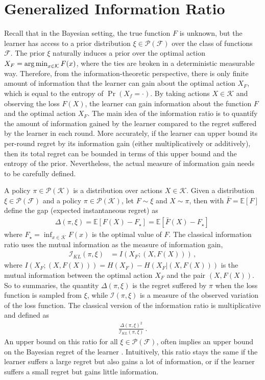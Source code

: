 \documentclass[letter, 12pt]{report}
\newcommand{\argmin}{\operatornamewithlimits{arg\,min}}
\newcommand{\E}{\mathbb E}
\newcommand{\cK}{\mathcal K}
\newcommand{\sF}{\mathscr F}
\newcommand{\sP}{\mathscr P}
\newcommand{\I}{\mathcal{I}}
\newcommand{\1}{\mathbf{1}}
\theoremstyle{plain}
\theoremstyle{definition}
\theoremstyle{remark}
\begin{document}
\section{Generalized Information Ratio}
\label{sec:gen-inf-ratio}
Recall that in the Bayesian setting, the true function $F$ is unknown, but the learner has access to a prior distribution $\xi \in \sP(\sF)$ over the class of functions $\sF$.
The prior $\xi$ naturally induces a prior over the optimal action $X_F = \argmin_{x \in \cK} F(x)$, where the ties are broken in a deterministic measurable way.
Therefore, from the information-theoretic perspective, there is only finite amount of information that the learner can gain about the optimal action $X_F$, which is equal to the entropy of $\Pr(X_f=\cdot)$.
By taking actions $X \in \cK$ and observing the loss $F(X)$, the learner can gain information about the function $F$ and the optimal action $X_F$.
The main idea of the information ratio is to quantify the amount of information gained by the learner compared to the regret suffered by the learner in each round.
More accurately, if the learner can upper bound its per-round regret by its information gain (either multiplicatively or additively), then its total regret can be bounded in terms of this upper bound and the entropy of the prior.
Nevertheless, the actual measure of information gain needs to be carefully defined.

A policy $\pi \in \sP(\cK)$ is a distribution over actions $X \in \cK$.
Given a distribution $\xi \in \sP(\sF)$ and a policy $\pi \in \sP(\cK)$, let $F \sim \xi$ and $X \sim \pi$, then with $\bar F = \E[F]$ define the gap (expected instantaneous regret) as
\begin{align*}
    \Delta(\pi, \xi)
    = \E\left[F(X) - F_\star\right]
    = \E\left[\bar F(X) - F_\star\right]\,
\end{align*}
where $F_\star = \inf_{x \in \cK} F(x)$ is the optimal value of $F$.
The classical information ratio \citep{RV16} uses the mutual information as the measure of information gain,
\begin{align*}
    \I_{KL}(\pi, \xi) & = I\left(X_F; (X, F(X))\right)\,,
\end{align*}
where $I\left( X_F; (X, F(X)) \right) = H(X_F) - H(X_F| (X, F(X)))$ is the mutual information between the optimal action $X_F$ and the pair $(X, F(X))$.
So to summaries, the quantity $\Delta(\pi, \xi)$ is the regret suffered by $\pi$ when the loss function is sampled from $\xi$, while $\I(\pi, \xi)$ is a measure of the observed variation
of the loss function.
The classical version of the information ratio is multiplicative and defined as
\begin{align*}
    \frac{\Delta(\pi, \xi)^2}{\I_{KL}(\pi, \xi)}\,.
\end{align*}
An upper bound on this ratio for all $\xi \in \sP(\sF)$, often implies an upper bound on the Bayesian regret of the learner \cite{RV16}.
Intuitively, this ratio stays the same if the learner suffers a large regret but also gains a lot of information, or if the learner suffers a small regret but gains little information.
\end{document}
